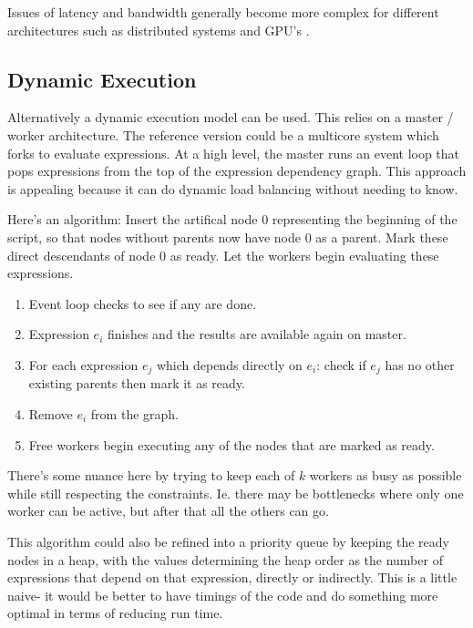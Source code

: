 \documentclass[12pt]{article}
\begin{document}


Issues of latency and bandwidth generally become more complex for different
architectures such as distributed systems and GPU's
\cite{matloff2015parallel}.

\subsection{Dynamic Execution}

Alternatively a dynamic execution model can be used. This relies on a
master / worker architecture. The reference version could be a multicore
system which forks to evaluate expressions.  At a high level, the master
runs an event loop that pops expressions from the top of the expression
dependency graph.
This approach is appealing
because it can do dynamic load balancing without needing to know.

Here's an algorithm: Insert the artifical node 0 representing the beginning
of the script, so that nodes without parents now have node 0 as a parent. Mark
these direct descendants of node 0 as ready. Let the workers begin evaluating
these expressions.

\begin{enumerate}
    \item Event loop checks to see if any are done.
    \item Expression $e_i$ finishes and the results are available again
        on master.
    \item For each expression $e_j$ which depends directly on $e_i$: check
        if $e_j$ has no other existing parents then mark it as ready.
    \item Remove $e_i$ from the graph.
    \item Free workers begin executing any of the nodes that are marked as ready.
\end{enumerate}

There's some nuance here by trying to keep each of $k$ workers as busy as
possible while still respecting the constraints. Ie. there may be
bottlenecks where only one worker can be active, but after that all the
others can go.

This algorithm could also be refined into a priority queue by keeping the ready
nodes in a heap, with the values determining the heap order as the number
of expressions that depend on that expression, directly or indirectly. This
is a little naive- it would be better to have timings of the code and do
something more optimal in terms of reducing run time.
\end{document}
